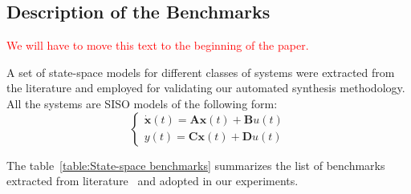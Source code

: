 \documentclass[runningheads,a4paper]{llncs}
\begin{document}
\subsection{Description of the Benchmarks}

\textcolor{red}{We will have to move this text to the beginning of the paper.}



A set of state-space models for different classes of systems were extracted from the literature and employed for validating our automated synthesis methodology. All the systems are SISO models of the following form:
\begin{equation}
\left\lbrace\begin{array}{c}
\dot{\textbf{x}}(t)=\textbf{A}\textbf{x}(t)+\textbf{B}u(t)\\
y(t)=\textbf{C}\textbf{x}(t)+\textbf{D}u(t)
\end{array}\right.
\end{equation}

The table~\ref{table:State-space benchmarks} summarizes the list of benchmarks extracted from literature~\cite{Franklin15,converters,maglev,CTMS} and adopted in our experiments.
\end{document}
